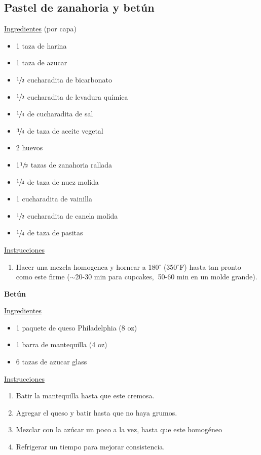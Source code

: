 \subsection{Pastel de zanahoria y bet\'un}

\underline{Ingredientes} (por capa)
\begin{itemize}
\item 1 taza de harina
\item 1 taza de azucar
\item $\sfrac{1}{2}$ cucharadita de bicarbonato
\item $\sfrac{1}{2}$ cucharadita de levadura qu\'imica
\item $\sfrac{1}{4}$ de cucharadita de sal
\item $\sfrac{3}{4}$ de taza de aceite vegetal
\item 2 huevos
\item 1$\sfrac{1}{2}$ tazas de zanahoria rallada
\item $\sfrac{1}{4}$ de taza de nuez molida
\item 1 cucharadita de vainilla
\item $\sfrac{1}{2}$ cucharadita de canela molida
\item $\sfrac{1}{4}$ de taza de pasitas
\end{itemize}

\underline{Instrucciones}
\begin{enumerate}
\item Hacer una mezcla homogenea y hornear a 180$^\circ$ (350$^\circ$F) hasta tan pronto como este firme ($\sim$20-30 min para cupcakes, $~$50-60 min en un molde grande).\\
\end{enumerate}

\textbf{Betún}

\underline{Ingredientes}
\begin{itemize}
\item 1 paquete de queso Philadelphia (8 oz)
\item 1 barra de mantequilla (4 oz)
\item 6 tazas de azucar glass
\end{itemize}

\underline{Instrucciones}
\begin{enumerate}
\item Batir la mantequilla hasta que este cremosa.
\item Agregar el queso y batir hasta que no haya grumos.
\item Mezclar con la az\'ucar un poco a la vez, hasta que este homog\'eneo
\item Refrigerar un tiempo para mejorar consistencia.
\end{enumerate}

